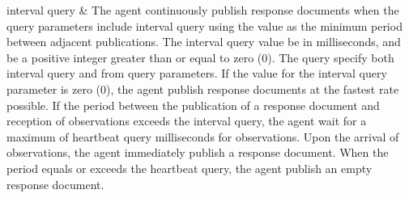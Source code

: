 \documentclass{mtconnect}	%
\begin{document}
\begin{longtabu}
\gls{interval query}
&
The \gls{agent} \MUST continuously publish \glspl{response document} when the query parameters include \gls{interval query} using the value as the minimum period between adjacent publications.
\newline The \gls{interval query} value \MUST be in milliseconds, and \MUST be a positive integer greater than or equal to zero (0).
\newline The \gls{query} \MUSTNOT specify both \gls{interval query} and \gls{from query} parameters.
\newline If the value for the \gls{interval query} parameter is zero (0), the \gls{agent} \MUST publish  \glspl{response document} at the fastest rate possible.
\newline If the period between the publication of a \gls{response document} and reception of \glspl{observation} exceeds the \gls{interval query}, the \gls{agent} \MUST wait for a maximum of \gls{heartbeat query} milliseconds for \glspl{observation}. Upon the arrival of \glspl{observation}, the \gls{agent} \MUST immediately publish a \gls{response document}. When the period equals or exceeds the \gls{heartbeat query}, the \gls{agent} \MUST publish an empty \gls{response document}. \\
\hline


\end{longtabu}
\end{document}
